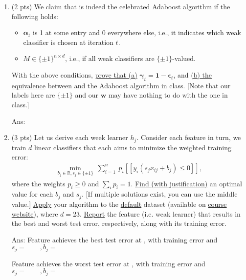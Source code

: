 \documentclass[10pt,letter,notitlepage]{article}
\newcommand{\wv}{\mathbf{w}}
\newcommand{\RR}{\mathds{R}}
\newcommand{\alphav}{\boldsymbol{\alpha}}
\newcommand{\epsilonv}{\boldsymbol{\epsilon}}
\newcommand{\gammav}{\boldsymbol{\gamma}}
\newcommand{\ans}[1]{{\color{blue}\textsf{Ans}: #1}}
\newcommand{\one}{\mathbf{1}}
\newcommand{\pred}[1]{[\![#1]\!]}
\newcommand{\ie}{{i.e.}\xspace}
\begin{document}
\begin{exercise}
		\begin{enumerate}
		\item (2 pts) We claim that  is indeed the celebrated Adaboost algorithm if the following holds: 
		\begin{itemize}
		\item $\alphav_t$ is 1 at some entry and 0 everywhere else, i.e., it indicates which weak classifier is chosen at iteration $t$. 
		\item $M \in \{\pm1\}^{n\times d}$, \ie, if all weak classifiers are $\{\pm 1\}$-valued.
		\end{itemize}
		With the above conditions, \uline{prove that (a)} $\gammav_t = \one - \epsilonv_t$, and \uline{(b) the equivalence} between  and the Adaboost algorithm in class. [Note that our labels here are $\{\pm1\}$ and our $\wv$ may have nothing to do with the one in class.]
		
		\ans{\vskip8cm
		}

		\item (3 pts) Let us derive each week learner $h_j$. Consider each feature in turn, we train $d$ linear classifiers that each aims to minimize the weighted training error: 
		\begin{align}
			\min_{b_j\in \RR, s_j \in \{\pm1\}} ~ \sum_{i=1}^n ~ p_i \pred{ y_i (s_j x_{ij} + b_j) \leq 0  },
		\end{align}
		where the weights $p_i \geq 0$ and $\sum_i p_i = 1$. 
		\uline{Find (with justification)} an optimal value for each $b_j$ and $s_j$. [If multiple solutions exist, you can use the middle value.] \uline{Apply} your algorithm to the \href{https://archive.ics.uci.edu/ml/datasets/default+of+credit+card+clients}{default} dataset (available on \href{https://cs.uwaterloo.ca/~y328yu/mycourses/480/assignment.html}{course website}), where $d=23$. \uline{Report} the feature (\ie weak learner) that results in the best and worst test error, respectively, along with its training error. 
		
		\ans{%
		\vskip5cm
		Feature \qquad achieves the best test error at \qquad, with training error \qquad  and $s_j = \qquad , b_j = \qquad $

		Feature \qquad achieves the worst test error at \qquad, with training error \qquad  and $s_j = \qquad , b_j = \qquad $
		}
		

\end{enumerate}
\end{exercise}
\end{document}
